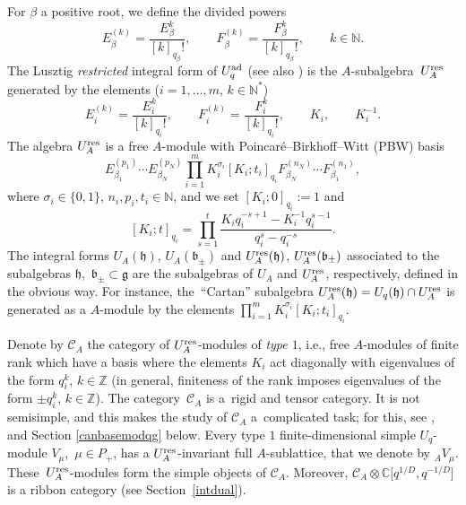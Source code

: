 \documentclass[10pt,a4paper]{amsart}
\numberwithin{equation}{section}
\theoremstyle{definition}
\newcommand{\mc}{\mathbb{C}}
\newcommand{\mz}{\mathbb{Z}}
\newcommand{\mn}{\mathbb{N}}
\begin{document}
For $\beta$ a positive root, we define the divided powers
\[E_{\beta}^{(k)} = \frac{E_\beta^k}{[k]_{q_\beta}!} , \qquad F_{\beta}^{(k)} = \frac{F_\beta^k}{[k]_{q_\beta}!}, \qquad k\in \mn.\]
The Lusztig {\it restricted} integral form of $U_q^{\rm ad}$ \cite{Lusztig2,Lusztig} (see also \cite[Chapter 9.3]{CP}) is the $A$-sub\-algebra~$U_A^{\rm res}$ generated by the elements ($i=1,\dots,m$, $k\in \mn^*$)
\[E_i^{(k)}= \frac{E_i^k}{[k]_{q_i}!},\qquad F_i^{(k)}= \frac{F_i^k}{[k]_{q_i}!} ,\qquad K_i ,\qquad K_i^{-1}.\]
The algebra $U_A^{\rm res}$ is a free $A$-module with Poincar\'e--Birkhoff--Witt (PBW) basis
\[%
E_{\beta_1}^{(p_1)}\cdots E_{\beta_N}^{(p_N)}\prod_{i=1}^m K_i^{\sigma_i}[ K_i; t_i]_{q_i} F_{\beta_N}^{(n_N)}\cdots F_{\beta_1}^{(n_1)},
\]
where $\sigma_i\in \{0,1\}$, $n_i,p_i, t_i\in \mn$, and we set $[ K_i; 0]_{q_i}:=1$ and
\[[ K_i; t ]_{q_i}= \prod_{s=1}^t \frac{K_iq_i^{-s+1}-K_i^{-1}q_i^{s-1}}{q_i^s-q_i^{-s}}.\]
The integral forms $U_A(\mathfrak{h})$, $U_A(\mathfrak{b}_\pm)$ and $U_A^{\rm res}(\mathfrak{h})$, $U_A^{\rm res}(\mathfrak{b}_\pm)$ associated to the subalgebras $\mathfrak{h}$,~$\mathfrak{b}_\pm \subset \mathfrak{g}$ are the subalgebras of $U_A$ and $U_A^{\rm res}$, respectively, defined in the obvious way. For instance, the~``Cartan'' subalgebra $U_A^{\rm res}(\mathfrak{h}) = U_q(\mathfrak{h})\cap U_A^{\rm res}$ is generated as a $A$-module by the elements $\prod_{i=1}^m K_i^{\sigma_i}[ K_i; t_i]_{q_i}$.

Denote by $\mathcal{C}_A$ the category of $U_A^{\rm res}$-modules of {\it type $1$}, i.e., free $A$-modules of finite rank which have a basis where the elements $K_i$ act diagonally with eigenvalues of the form $q_i^k$, $k\in \mz$ (in general, finiteness of the rank imposes eigenvalues of the form $\pm q_i^k$, $k\in \mz$). The category~$\mathcal{C}_A$ is a~rigid and tensor category. It is not semisimple, and this makes the study of $\mathcal{C}_A$ a~complicated task; for this, see \cite{BR}, and Section \ref{canbasemodqg} below. Every type $1$ finite-dimensional simple $U_q$-module $V_\mu$,~$\mu \in P_+$, has a $U_A^{\rm res}$-invariant full $A$-sublattice, that we denote by ${}_AV_\mu$. These~$U_A^{\rm res}$-modules form the simple objects of $\mathcal{C}_A$. Moreover, $\mathcal{C}_A \otimes \mc\big[q^{1/D},q^{-1/D}\big]$ is a ribbon category (see Section~\ref{intdual}).
\end{document}
